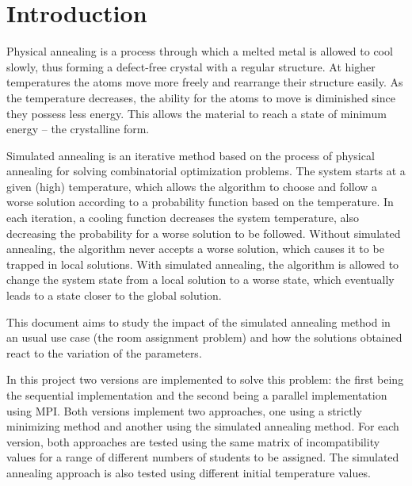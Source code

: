 \section{Introduction}
Physical annealing is a process through which a melted metal is allowed to cool slowly, thus forming a defect-free crystal with a regular structure. At higher temperatures the atoms move more freely and rearrange their structure easily. As the temperature decreases, the ability for the atoms to move is diminished since they possess less energy. This allows the material to reach a state of minimum energy -- the crystalline form.

Simulated annealing is an iterative method based on the process of physical annealing for solving combinatorial optimization problems. The system starts at a given (high) temperature, which allows the algorithm to choose and follow a worse solution according to a probability function based on the temperature. In each iteration, a cooling function decreases the system temperature, also decreasing the probability for a worse solution to be followed. Without simulated annealing, the algorithm never accepts a worse solution, which causes it to be trapped in local solutions. With simulated annealing, the algorithm is allowed to change the system state from a local solution to a worse state, which eventually leads to a state closer to the global solution.

This document aims to study the impact of the simulated annealing method in an usual use case (the room assignment problem) and how the solutions obtained react to the variation of the parameters.

In this project two versions are implemented to solve this problem: the first being the sequential implementation and the second being a parallel implementation using MPI. Both versions implement two approaches, one using a strictly minimizing method and another using the simulated annealing method. For each version, both approaches are tested using the same matrix of incompatibility values for a range of different numbers of students to be assigned. The simulated annealing approach is also tested using different initial temperature values.